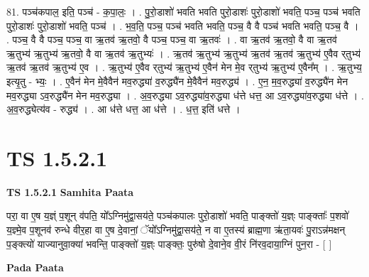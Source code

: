 \documentclass[17pt]{extarticle}
\begin{document}
81. पञ्च॑कपाल॒ इति॒ पञ्च॑ - क॒पा॒लः॒ । . पु॒रो॒डाशो॑ भवति भवति पुरो॒डाशः॑ पुरो॒डाशो॑ भवति॒ पञ्च॒ पञ्च॑ भवति पुरो॒डाशः॑ पुरो॒डाशो॑ भवति॒ पञ्च॑ । . भ॒व॒ति॒ पञ्च॒ पञ्च॑ भवति भवति॒ पञ्च॒ वै वै पञ्च॑ भवति भवति॒ पञ्च॒ वै । . पञ्च॒ वै वै पञ्च॒ पञ्च॒ वा ऋ॒तव॑ ऋ॒तवो॒ वै पञ्च॒ पञ्च॒ वा ऋ॒तवः॑ । . वा ऋ॒तव॑ ऋ॒तवो॒ वै वा ऋ॒तव॑ ऋ॒तुभ्य॑ ऋ॒तुभ्य॑ ऋ॒तवो॒ वै वा ऋ॒तव॑ ऋ॒तुभ्यः॑ । . ऋ॒तव॑ ऋ॒तुभ्य॑ ऋ॒तुभ्य॑ ऋ॒तव॑ ऋ॒तव॑ ऋ॒तुभ्य॑ ए॒वैव र्‌तुभ्य॑ ऋ॒तव॑ ऋ॒तव॑ ऋ॒तुभ्य॑ ए॒व । . ऋ॒तुभ्य॑ ए॒वैव र्‌तुभ्य॑ ऋ॒तुभ्य॑ ए॒वैन॑ मेन मे॒व र्‌तुभ्य॑ ऋ॒तुभ्य॑ ए॒वैन᳚म् । . ऋ॒तुभ्य॒ इत्यृ॒तु - भ्यः॒ । . ए॒वैन॑ मेन मे॒वैवैन॑ मव॒रुद्ध्या॑ व॒रुद्ध्यै॑न मे॒वैवैन॑ मव॒रुद्ध्य॑ । . ए॒न॒ म॒व॒रुद्ध्या॑ व॒रुद्ध्यै॑न मेन मव॒रुद्ध्या ऽव॒रुद्ध्यै॑न मेन मव॒रुद्ध्या । . अ॒व॒रुद्ध्या ऽव॒रुद्ध्या॑व॒रुद्ध्या ध॑त्ते धत्त॒ आ ऽव॒रुद्ध्या॑व॒रुद्ध्या ध॑त्ते । . अ॒व॒रुद्ध्येत्य॑व - रुद्ध्य॑ । . आ ध॑त्ते धत्त॒ आ ध॑त्ते । . ध॒त्त॒ इति॑ धत्ते । \newline
\pagebreak
{}
\section*{ TS 1.5.2.1 }

\textbf{TS 1.5.2.1 } \newline
\textbf{Samhita Paata} \newline

परा॒ वा ए॒ष य॒ज्ञ्ं प॒शून् व॑पति॒ यो᳚ऽग्निमु॑द्वा॒सय॑ते॒ पञ्च॑कपालः पुरो॒डाशो॑ भवति॒ पाङ्क्तो॑ य॒ज्ञ्ः पाङ्क्ताः᳚ प॒शवो॑ य॒ज्ञ्मे॒व प॒शूनव॑ रुन्धे वीर॒हा वा ए॒ष दे॒वानां॒ ॅयो᳚ऽग्निमु॑द्वा॒सय॑ते॒ न वा ए॒तस्य॑ ब्राह्म॒णा ऋ॑ता॒यवः॑ पु॒राऽन्न॑मक्षन् प॒ङ्क्त्यो॑ याज्यानुवा॒क्या॑ भवन्ति॒ पाङ्क्तो॑ य॒ज्ञ्ः पाङ्क्तः॒ पुरु॑षो दे॒वाने॒व वी॒रं नि॑रव॒दाया॒ग्निं पुन॒रा - [ ] \newline

\textbf{Pada Paata} \newline
\end{document}
